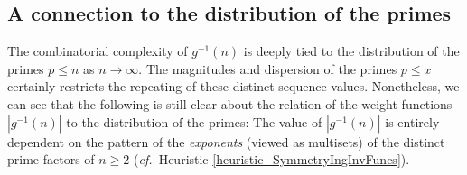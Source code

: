 \documentclass[11pt,reqno,a4letter]{article}
\numberwithin{figure}{section}
\numberwithin{table}{section}
\newcommand{\cf}{\textit{cf.\ }}
\theoremstyle{plain}
\numberwithin{theorem}{section}
\theoremstyle{definition}
\begin{document}
\subsection{A connection to the distribution of the primes} 
\label{subSection_AConnectionToDistOfThePrimes} 

The combinatorial complexity of $g^{-1}(n)$ is deeply tied to the distribution of the primes 
$p \leq n$ as $n \rightarrow \infty$. 
The magnitudes and dispersion of the primes $p \leq x$ certainly restricts the 
repeating of these distinct sequence values. 
Nonetheless, we can see that the following 
is still clear about the relation of the weight functions $|g^{-1}(n)|$ to the 
distribution of the primes: 
The value of $|g^{-1}(n)|$ is entirely dependent on the pattern of the \emph{exponents} 
(viewed as multisets) of the distinct prime factors of $n \geq 2$ 
(\cf Heuristic \ref{heuristic_SymmetryIngInvFuncs}). 
\end{document}
